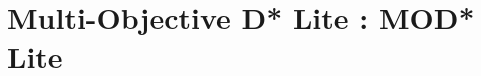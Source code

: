 \documentclass[10pt,journal]{IEEEtran}
\begin{document}
%

\section{Multi-Objective D*  Lite : MOD* Lite}
\label{chapter:proposedAlgorithm}
\end{document}
